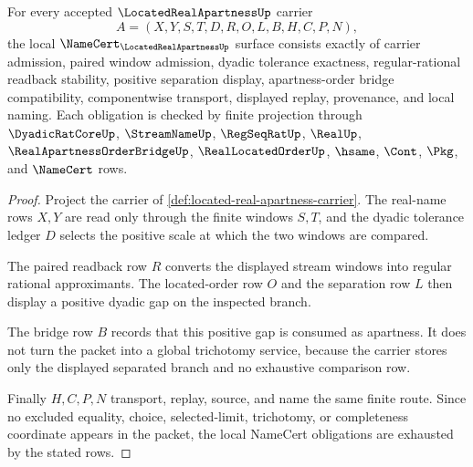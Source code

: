 \begin{theorem}
\label{thm:located-real-apartness-namecert-obligations}
For every accepted $\LocatedRealApartnessUp$ carrier
$$
A=(X,Y,S,T,D,R,O,L,B,H,C,P,N),
$$
the local $\NameCert_{\LocatedRealApartnessUp}$ surface consists exactly of carrier admission, paired window admission, dyadic tolerance exactness, regular-rational readback stability, positive separation display, apartness-order bridge compatibility, componentwise transport, displayed replay, provenance, and local naming. Each obligation is checked by finite projection through $\DyadicRatCoreUp$, $\StreamNameUp$, $\RegSeqRatUp$, $\RealUp$, $\RealApartnessOrderBridgeUp$, $\RealLocatedOrderUp$, $\hsame$, $\Cont$, $\Pkg$, and $\NameCert$ rows.
\end{theorem}
\begin{proof}
Project the carrier of \autoref{def:located-real-apartness-carrier}. The real-name rows $X,Y$ are read only through the finite windows $S,T$, and the dyadic tolerance ledger $D$ selects the positive scale at which the two windows are compared.

The paired readback row $R$ converts the displayed stream windows into regular rational approximants. The located-order row $O$ and the separation row $L$ then display a positive dyadic gap on the inspected branch.

The bridge row $B$ records that this positive gap is consumed as apartness. It does not turn the packet into a global trichotomy service, because the carrier stores only the displayed separated branch and no exhaustive comparison row.

Finally $H,C,P,N$ transport, replay, source, and name the same finite route. Since no excluded equality, choice, selected-limit, trichotomy, or completeness coordinate appears in the packet, the local NameCert obligations are exhausted by the stated rows.
\end{proof}

